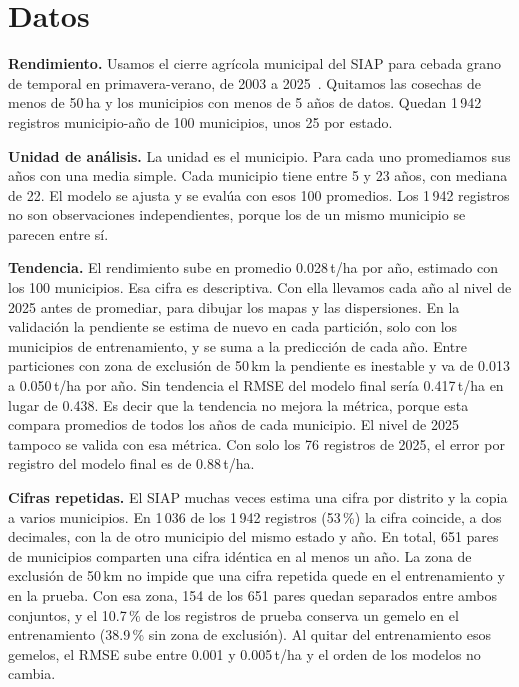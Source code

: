 \section{Datos}\label{sec:datos}

\textbf{Rendimiento.} Usamos el cierre agrícola municipal del SIAP para cebada grano de temporal en
primavera-verano, de 2003 a 2025~\cite{siap}. Quitamos las cosechas de menos de 50\,ha y los municipios con menos de
5 años de datos. Quedan 1\,942 registros municipio-año de 100 municipios, unos 25 por estado.

\textbf{Unidad de análisis.} La unidad es el municipio. Para cada uno promediamos sus años con una media simple. Cada
municipio tiene entre 5 y 23 años, con mediana de 22. El modelo se ajusta y se evalúa con esos 100 promedios. Los
1\,942 registros no son observaciones independientes, porque los de un mismo municipio se parecen entre sí.

\textbf{Tendencia.} El rendimiento sube en promedio 0.028\,t/ha por año, estimado con los 100 municipios. Esa cifra es
descriptiva. Con ella llevamos cada año al nivel de 2025 antes de promediar, para dibujar los mapas y las
dispersiones. En la validación la pendiente se estima de nuevo en cada partición, solo con los municipios de
entrenamiento, y se suma a la predicción de cada año. Entre particiones con zona de exclusión de 50\,km la pendiente
es inestable y va de 0.013 a 0.050\,t/ha por año. Sin tendencia el RMSE del modelo final sería 0.417\,t/ha en lugar de
0.438. Es decir que la tendencia no mejora la métrica, porque esta compara promedios de todos los años de cada
municipio. El nivel de 2025 tampoco se valida con esa métrica. Con solo los 76 registros de 2025, el error por
registro del modelo final es de 0.88\,t/ha.

\textbf{Cifras repetidas.} El SIAP muchas veces estima una cifra por distrito y la copia a varios municipios. En 1\,036
de los 1\,942 registros (53\,\%) la cifra coincide, a dos decimales, con la de otro municipio del mismo estado y año.
En total, 651 pares de municipios comparten una cifra idéntica en al menos un año. La zona de exclusión de 50\,km
no impide que una cifra repetida quede en el entrenamiento y en la prueba. Con esa zona, 154 de los 651 pares
quedan separados entre ambos conjuntos, y el 10.7\,\% de los registros de prueba conserva un gemelo en el
entrenamiento (38.9\,\% sin zona de exclusión). Al quitar del entrenamiento esos gemelos, el RMSE sube entre 0.001
y 0.005\,t/ha y el orden de los modelos no cambia.


